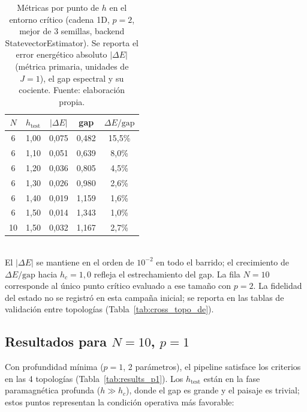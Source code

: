 \documentclass[11pt,a4paper,spanish]{book}
\begin{document}
\begin{table}[H]
\centering
\caption[Barrido por $h$ cerca del punto crítico (cadena 1D, $N = 6$, $p = 2$)]{Métricas por punto de $h$ en el entorno crítico (cadena 1D, $p = 2$, mejor de 3 semillas, backend StatevectorEstimator). Se reporta el error energético absoluto $|\Delta E|$ (métrica primaria, unidades de $J = 1$), el gap espectral y su cociente. Fuente: elaboración propia.}
\label{tab:critical_sweep}
\begin{tabular}{ccccc}
\toprule
\textbf{$N$} & \textbf{$h_{\text{test}}$} & \textbf{$|\Delta E|$} & \textbf{gap} & \textbf{$\Delta E/\text{gap}$} \\
\midrule
6  & 1,00 & 0,075 & 0,482 & 15,5\% \\
6  & 1,10 & 0,051 & 0,639 & 8,0\% \\
6  & 1,20 & 0,036 & 0,805 & 4,5\% \\
6  & 1,30 & 0,026 & 0,980 & 2,6\% \\
6  & 1,40 & 0,019 & 1,159 & 1,6\% \\
6  & 1,50 & 0,014 & 1,343 & 1,0\% \\
10 & 1,50 & 0,032 & 1,167 & 2,7\% \\
\bottomrule
\end{tabular}
\\[2pt]
\footnotesize El $|\Delta E|$ se mantiene en el orden de $10^{-2}$ en todo el barrido; el crecimiento de $\Delta E/\text{gap}$ hacia $h_c = 1{,}0$ refleja el estrechamiento del gap. La fila $N = 10$ corresponde al único punto crítico evaluado a ese tamaño con $p = 2$. La fidelidad del estado no se registró en esta campaña inicial; se reporta en las tablas de validación entre topologías (Tabla~\ref{tab:cross_topo_de}).
\end{table}

\subsection{Resultados para $N = 10$, $p = 1$}

Con profundidad mínima ($p = 1$, 2 parámetros), el pipeline satisface los criterios en las 4 topologías (Tabla~\ref{tab:results_p1}). Los $h_{\text{test}}$ están en la fase paramagnética profunda ($h \gg h_c$), donde el gap es grande y el paisaje es trivial; estos puntos representan la condición operativa más favorable:
\end{document}

